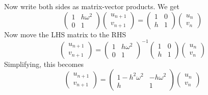 \documentclass[hidelinks,notitlepage]{book}
\begin{document}
Now write both sides as matrix-vector products.  We get
\begin{equation}
\nonumber
\begin{pmatrix}
1 &  h \omega^2 \\
0 & 1
\end{pmatrix}
\begin{pmatrix}
u_{n+1} \\
v_{n+1}
\end{pmatrix}
=
\begin{pmatrix}
1 &  0 \\
h & 1
\end{pmatrix}
\begin{pmatrix}
u_{n} \\
v_{n}
\end{pmatrix}
\end{equation}
Now move the LHS matrix to the RHS
\begin{equation}
\nonumber
\begin{pmatrix}
u_{n+1} \\
v_{n+1}
\end{pmatrix}
=
\begin{pmatrix}
1 &  h \omega^2 \\
0 & 1
\end{pmatrix}^{-1}
\begin{pmatrix}
1 &  0 \\
h & 1
\end{pmatrix}
\begin{pmatrix}
u_{n} \\
v_{n}
\end{pmatrix}
\end{equation}
Simplifying, this becomes
\begin{equation}
\begin{pmatrix}
u_{n+1} \\
v_{n+1}
\end{pmatrix}
=
\begin{pmatrix}
1 - h^2 \omega^2&  -h \omega^2 \\
h & 1
\end{pmatrix}
\begin{pmatrix}
u_{n} \\
v_{n}
\end{pmatrix}
\end{equation}
\end{document}
